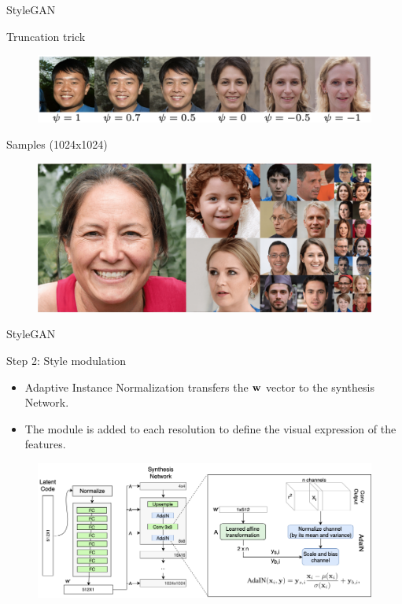 \documentclass{beamer}
\begin{document}
\begin{frame}{StyleGAN}
	\begin{block}{Truncation trick}
		\begin{figure}
			\centering
			\includegraphics[width=0.85\linewidth]{figs/stylegan_truncation}
		\end{figure}
		\vspace{-0.4cm}
	\end{block}
	\begin{block}{Samples (1024x1024)}
		\begin{figure}
			\centering
			\includegraphics[width=0.8\linewidth]{figs/stylegan_samples}
		\end{figure}
	\end{block}
	
\end{frame}
\begin{frame}{StyleGAN}
	\begin{block}{Step 2: Style modulation}
		\begin{itemize}
			\item Adaptive Instance Normalization transfers the $\mathbf{w}$ vector to the synthesis Network.
			\item The module is added to each resolution to define the visual expression of the features.
		\end{itemize}
		\begin{figure}
			\centering
			\includegraphics[width=1.0\linewidth]{figs/stylegan_adain}
		\end{figure}
	\end{block}

\end{frame}
\end{document}
